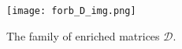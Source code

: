 \documentclass[12pt]{book}
\theoremstyle{plain}
\theoremstyle{remark}
\begin{document}
\begin{comment}
	\begin{matrix}
	  \textcolor{dark-green}{\bullet} \\ \textcolor{dark-orange}{\bullet} \\ \\
	  \end{matrix}
		&&
	D_6 = \bordermatrix{ & \cr
	\textbf L & 1 0 \cr
	\textbf R & 0 1 \cr
	\textbf{LR} & 0 0 }
	\begin{matrix}
	  \textcolor{dark-green}{\bullet} \\ \textcolor{dark-green}{\bullet} \\ \\
	  \end{matrix}
	&&
	D_7 = \bordermatrix{ & \cr
	\textbf L & 1 0 0 \cr
	\textbf{LR} & 0 1 0 \cr
	\textbf{LR} & 0 0 1 }
	\end{align*}
	\begin{align*}
		D_8 = \bordermatrix{ & \cr
	\textbf L & 1 1 0 \cr
	\textbf{LR} & 1 0 1 \cr
	\textbf{LR}  & 0 1 1 }
		&&
		D_9 = \bordermatrix{ & \cr
	\textbf L & 1 1 1 0  \cr
	\textbf{LR} & 1 1 0 0  \cr
	\textbf{LR} & 1 0 0 1  }
		&&
		D_{10} = \bordermatrix{ &  \cr
	\textbf L & 1 1 0 0 \cr
	\textbf R & 0 0 1 1 \cr
	\textbf{LR} & 1 0  1 1 \cr
	\textbf{LR} & 1 1 0 1  }
	\begin{matrix}
	  \textcolor{dark-green}{\bullet} \\ \textcolor{dark-orange}{\bullet} \\ \\ \\ \\
	  \end{matrix}
	\end{align*}
	\begin{align*}
		D_{11} = \bordermatrix{ & \cr
			\textbf{LR} & 1 0 0 \cr
			\textbf{LR} & 0 1 0 \cr	
			\textbf{LR} & 0 0 1  }
		&&
		D_{12} = \bordermatrix{ & \cr
			\textbf{LR} & 1 0 1 \cr
			\textbf{LR} & 1 1 0 \cr	
			\textbf{LR} & 0 1 1  }
	&&
		D_{13}= \bordermatrix{ &  \cr
			\textbf{LR} & 1 1 0 0 \cr
			\textbf{LR} & 0 1 1 0 \cr	
			\textbf{LR} & 0 0 1 1 }			
	\end{align*}
	}
	\caption{The family of enriched matrices $\mathcal{D}$.} 
	\label{fig:forb_D}
	\end{figure}	
\end{comment}

\begin{figure}[h]
	\centering
	\texttt{[image: forb\_D\_img.png]}
	\caption{The family of enriched matrices $\mathcal{D}$.} 
	\label{fig:forb_D}
\end{figure}	
\end{document}
